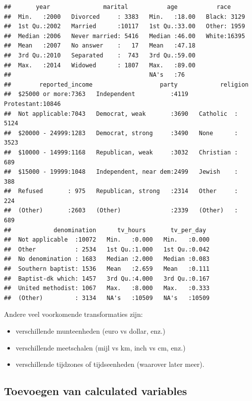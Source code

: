 \documentclass[]{tufte-book}
\providecommand{\tightlist}{%
  \setlength{\itemsep}{0pt}\setlength{\parskip}{0pt}}
\begin{document}
\begin{verbatim}
##       year               marital           age           race      
##  Min.   :2000   Divorced     : 3383   Min.   :18.00   Black: 3129  
##  1st Qu.:2002   Married      :10117   1st Qu.:33.00   Other: 1959  
##  Median :2006   Never married: 5416   Median :46.00   White:16395  
##  Mean   :2007   No answer    :   17   Mean   :47.18                
##  3rd Qu.:2010   Separated    :  743   3rd Qu.:59.00                
##  Max.   :2014   Widowed      : 1807   Max.   :89.00                
##                                       NA's   :76                   
##        reported_income                   party            religion    
##  $25000 or more:7363   Independent          :4119   Protestant:10846  
##  Not applicable:7043   Democrat, weak       :3690   Catholic  : 5124  
##  $20000 - 24999:1283   Democrat, strong     :3490   None      : 3523  
##  $10000 - 14999:1168   Republican, weak     :3032   Christian :  689  
##  $15000 - 19999:1048   Independent, near dem:2499   Jewish    :  388  
##  Refused       : 975   Republican, strong   :2314   Other     :  224  
##  (Other)       :2603   (Other)              :2339   (Other)   :  689  
##            denomination      tv_hours       tv_per_day   
##  Not applicable  :10072   Min.   :0.000   Min.   :0.000  
##  Other           : 2534   1st Qu.:1.000   1st Qu.:0.042  
##  No denomination : 1683   Median :2.000   Median :0.083  
##  Southern baptist: 1536   Mean   :2.659   Mean   :0.111  
##  Baptist-dk which: 1457   3rd Qu.:4.000   3rd Qu.:0.167  
##  United methodist: 1067   Max.   :8.000   Max.   :0.333  
##  (Other)         : 3134   NA's   :10509   NA's   :10509
\end{verbatim}

Andere veel voorkomende transformaties zijn:

\begin{itemize}
\tightlist
\item
  verschillende munteenheden (euro vs dollar, enz.)
\item
  verschillende meetschalen (mijl vs km, inch vs cm, enz.)
\item
  verschillende tijdzones of tijdseenheden (waarover later meer).
\end{itemize}

\hypertarget{toevoegen-van-calculated-variables}{%
\subsection{Toevoegen van calculated variables}\label{toevoegen-van-calculated-variables}}
\end{document}
